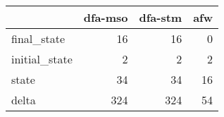 \begin{tabular}{lrrr}
\toprule
{} &  dfa-mso &  dfa-stm &  afw \\
\midrule
final\_state   &       16 &       16 &    0 \\
initial\_state &        2 &        2 &    2 \\
state         &       34 &       34 &   16 \\
delta         &      324 &      324 &   54 \\
\bottomrule
\end{tabular}
